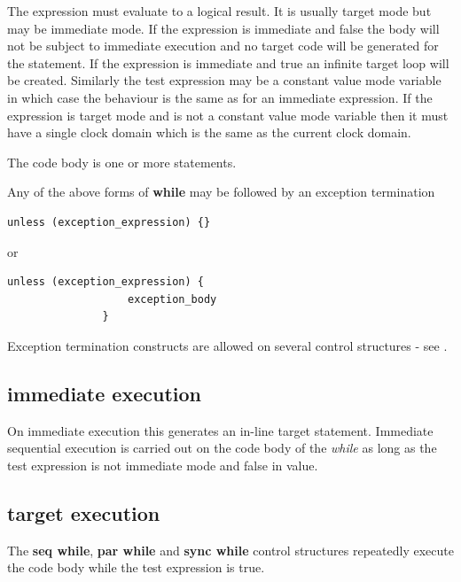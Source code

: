         The expression must evaluate to a logical result. It is usually target
        mode but may be immediate mode. If the expression is immediate and
        false the body will not be subject to immediate execution and no
        target code will be generated for the statement. If the expression is
        immediate and true an infinite target loop will be created. Similarly
        the test expression may be a constant value mode variable in which
        case the behaviour is the same as for an immediate expression. If the
        expression is target mode and is not a constant value mode variable
        then it must have a single clock domain which is the same as the current
        clock domain.
        
        The code body is one or more statements.
        
        Any of the above forms of {\bf while} may be followed by an
        exception termination
        \begin{lstlisting}[gobble=8, language=threepl]
               unless (exception_expression) {}
        \end{lstlisting}
        or
        \begin{lstlisting}[gobble=8, language=threepl]
               unless (exception_expression) {
                   exception_body
               }
        \end{lstlisting}
        
        Exception termination constructs are allowed on several control structures
        - see .

        \subsection{immediate execution}
        
            On immediate execution this generates an in-line target statement.
            Immediate sequential execution is carried out on the code body
            of the {\em while} as long as the test expression is not immediate
            mode and false in value.
        
        \subsection{target execution}

            The {\bf seq while}, {\bf par while} and {\bf sync while} control
            structures repeatedly execute the code body while the test
            expression is true.

